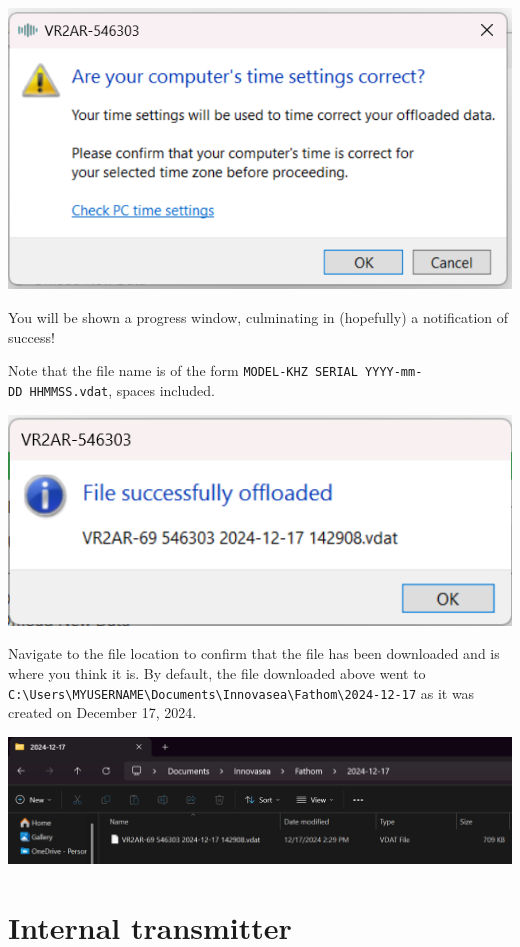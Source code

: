 \documentclass[
  letterpaper,
  DIV=11,
  numbers=noendperiod]{scrreprt}
\begin{document}
\includegraphics{images/fathom/time_warning.png}

You will be shown a progress window, culminating in (hopefully) a
notification of success!

Note that the file name is of the form
\texttt{MODEL-KHZ\ SERIAL\ YYYY-mm-DD\ HHMMSS.vdat}, spaces included.

\includegraphics{images/fathom/offload_success.png}

Navigate to the file location to confirm that the file has been
downloaded and is where you think it is. By default, the file downloaded
above went to
\texttt{C:\textbackslash{}Users\textbackslash{}MYUSERNAME\textbackslash{}Documents\textbackslash{}Innovasea\textbackslash{}Fathom\textbackslash{}2024-12-17}
as it was created on December 17, 2024.

\includegraphics{images/fathom/file_location.png}

\section{Internal transmitter}\label{internal-transmitter}
\end{document}
